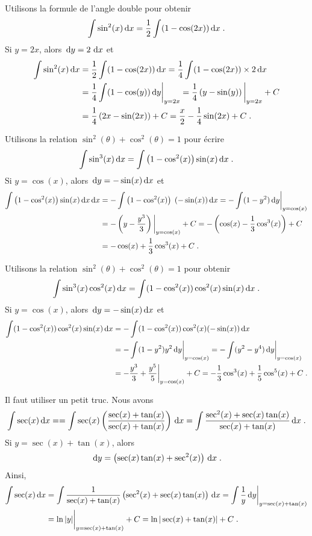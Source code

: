 {\begin{egg}
 Utilisons la formule de l'angle double pour obtenir
\[
\int \sin^2(x) \,\mathrm{d}x = \frac{1}{2} \int (1-\cos(2x)) \,\mathrm{d}x \; .
\]
Si $y=2x$, alors $\,\mathrm{d}y = 2\,\,\mathrm{d}x$ et
\begin{align*}
\int \sin^2(x) \,\mathrm{d}x &= \frac{1}{2} \int (1-\cos(2x))  \,\mathrm{d}x
= \frac{1}{4} \int (1-\cos(2x)) \times 2  \,\mathrm{d}x \\
&= \frac{1}{4} \int (1-\cos(y))  \,\mathrm{d}y \bigg|_{y=2x}
= \frac{1}{4} \left( y - \sin(y) \right) \bigg|_{y=2x} +C \\
&= \frac{1}{4} \left( 2x - \sin(2x) \right) +C
= \frac{x}{2} - \frac{1}{4}\sin(2x) +C \; .
\end{align*}

 Utilisons la relation $\sin^2(\theta) + \cos^2(\theta)=1$
pour écrire
\[
\int \sin^3(x)\,\mathrm{d}x = \int \left(1-\cos^2(x)\right) \sin(x)\,\mathrm{d}x \; .
\]
Si $y = \cos(x)$, alors $\,\mathrm{d}y = -\sin(x)\,\mathrm{d}x$ et
\begin{align*}
\int \left(1-\cos^2(x)\right) \sin(x)\,\mathrm{d}x \,\mathrm{d}x &=
 - \int \left(1- \cos^2(x)\right) \; ( -\sin(x)) \,\mathrm{d}x
= - \int (1-y^2) \,\mathrm{d}y\bigg|_{y=\cos(x)} \\
&= - \left( y - \frac{y^3}{3}\right)\bigg|_{y=\cos(x)} + C
= - \left(\cos(x) - \frac{1}{3} \cos^3(x)\right) + C\\
&= -\cos(x) + \frac{1}{3} \cos^3(x) + C \; .
\end{align*}

 Utilisons la relation
$\sin^2(\theta) + \cos^2(\theta)=1$ pour obtenir
\[
\int \sin^3(x) \cos^2(x) \,\mathrm{d}x
= \int (1-\cos^2(x)) \cos^2(x) \sin(x) \,\mathrm{d}x \; .
\]
Si $y=\cos(x)$, alors $\,\mathrm{d}y = - \sin(x)\,\mathrm{d}x$ et
\begin{align*}
\int (1-\cos^2(x)) \cos^2(x) \sin(x) \,\mathrm{d}x
&= -\int (1-\cos^2(x)) \cos^2(x) (-\sin(x)) \,\mathrm{d}x \\
&= -\int (1-y^2)y^2  \,\mathrm{d}y\bigg|_{y=\cos(x)}
= -\int (y^2-y^4) \,\mathrm{d}y\bigg|_{y=\cos(x)} \\
&= -\frac{y^3}{3} + \frac{y^5}{5}\bigg|_{y=\cos(x)} + C
= -\frac{1}{3} \cos^3(x) + \frac{1}{5} \cos^5(x) + C \; .
\end{align*}

 Il faut utiliser un petit truc.  Nous avons
\[
\int \sec(x) \,\mathrm{d}x =
= \int \sec(x) \left(\frac{\sec(x)+\tan(x)}{\sec(x)+\tan(x)}\right) \,\mathrm{d}x
= \int \frac{\sec^2(x)+\sec(x)\tan(x)}{\sec(x)+\tan(x)} \,\mathrm{d}x \; .
\]
Si $y=\sec(x)+\tan(x)$, alors
\[
\,\mathrm{d}y = \left( \sec(x)\tan(x) + \sec^2(x) \right) \,\mathrm{d}x \; .
\]
Ainsi,
\begin{align*}
\int \sec(x) \,\mathrm{d}x &
= \int \frac{1}{\sec(x)+\tan(x)}\left(\sec^2(x)+\sec(x)\tan(x)\right)\,\mathrm{d}x
= \int \frac{1}{y} \,\mathrm{d}y \bigg|_{y=\sec(x)+\tan(x)} \\
&= \ln|y|\bigg|_{y=\sec(x)+\tan(x)} + C
= \ln|\sec(x)+\tan(x)| + C  \; .
\end{align*}


\end{egg}}
